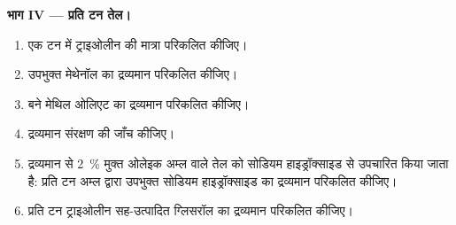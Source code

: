 \begin{problem}
\medskip
\noindent\textbf{भाग IV --- प्रति टन तेल।}
\begin{enumerate}[resume]
  \item एक टन में ट्राइओलीन की मात्रा परिकलित कीजिए।
  \item उपभुक्त मेथेनॉल का द्रव्यमान परिकलित कीजिए।
  \item बने मेथिल ओलिएट का द्रव्यमान परिकलित कीजिए।
  \item द्रव्यमान संरक्षण की जाँच कीजिए।
  \item द्रव्यमान से 2~\% मुक्त ओलेइक अम्ल वाले तेल को सोडियम हाइड्रॉक्साइड से उपचारित किया जाता है: प्रति टन अम्ल द्वारा
        उपभुक्त सोडियम हाइड्रॉक्साइड का द्रव्यमान परिकलित कीजिए।
  \item प्रति टन ट्राइओलीन सह-उत्पादित ग्लिसरॉल का द्रव्यमान परिकलित कीजिए।
\end{enumerate}
\end{problem}
